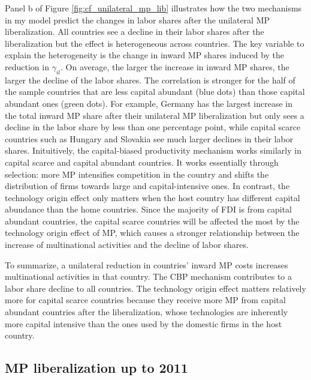 \documentclass[notitlepage,11pt]{article}%
\begin{document}
Panel b of Figure \ref{fig:cf_unilateral_mp_lib} illustrates how the two
mechanisms in my model predict the changes in labor shares after the
unilateral MP liberalization. All countries see a decline in their labor
shares after the liberalization but the effect is heterogeneous across
countries. The key variable to explain the heterogeneity is the change in
inward MP shares induced by the reduction in $\gamma_{il}$. On average, the
larger the increase in inward MP shares, the larger the decline of the labor
shares. The correlation is stronger for the half of the sample countries that
are less capital abundant (blue dots) than those capital abundant ones (green
dots). For example, Germany has the largest increase in the total inward MP
share after their unilateral MP liberalization but only sees a decline in the
labor share by less than one percentage point, while capital scarce countries
such as Hungary and Slovakia see much larger declines in their labor shares.
Inituitively, the capital-biased productivity mechanism works similarly in
capital scarce and capital abundant countries. It works essentially through
selection: more MP intensifies competition in the country and shifts the
distribution of firms towards large and capital-intensive ones. In contrast,
the technology origin effect only matters when the host country has different
capital abundance than the home countries. Since the majority of FDI is from
capital abundant countries, the capital scarce countries will be affected the
most by the technology origin effect of MP, which causes a stronger
relationship between the increase of multinational activities and the decline
of labor shares.

To summarize, a unilateral reduction in countries' inward MP costs increases
multinational activities in that country. The CBP mechanism contributes to a
labor share decline to all countries. The technology origin effect matters
relatively more for capital scarce countries because they receive more MP from
capital abundant countries after the liberalization, whose technologies are
inherently more capital intensive than the ones used by the domestic firms in
the host country.

\subsection{MP liberalization up to 2011}
\end{document}
